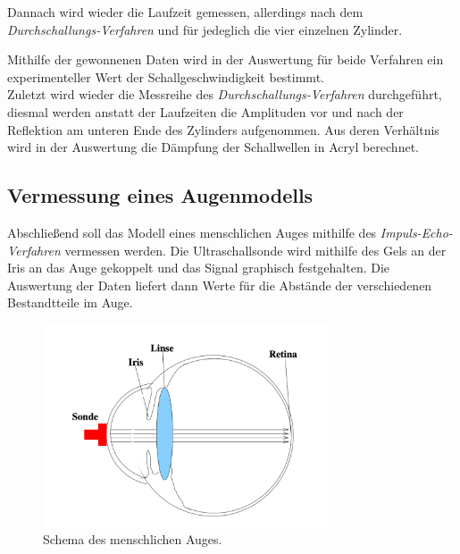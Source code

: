 Dannach wird wieder die Laufzeit gemessen, allerdings nach dem \textit{Durchschallungs-Verfahren} und für jedeglich die
vier einzelnen Zylinder.

Mithilfe der gewonnenen Daten wird in der Auswertung für beide Verfahren ein experimenteller Wert der Schallgeschwindigkeit bestimmt. \\

Zuletzt wird wieder die Messreihe des \textit{Durchschallungs-Verfahren} durchgeführt, diesmal werden anstatt der Laufzeiten die
Amplituden vor und nach der Reflektion am unteren Ende des Zylinders aufgenommen.
Aus deren Verhältnis wird in der Auswertung die Dämpfung der Schallwellen in Acryl berechnet.

\subsection{Vermessung eines Augenmodells}

Abschließend soll das Modell eines menschlichen Auges mithilfe des \textit{Impuls-Echo-Verfahren} vermessen werden.
Die Ultraschallsonde wird mithilfe des Gels an der Iris an das Auge gekoppelt und das Signal graphisch festgehalten.
Die Auswertung der Daten liefert dann Werte für die Abstände der verschiedenen Bestandtteile im Auge.
\begin{figure}
    \centering
    \includegraphics[height=6cm]{content/Abbildungen/Schema_Auge.pdf}
    \caption{Schema des menschlichen Auges.\cite{US1}}
    \label{fig:Schema Auge}
\end{figure}